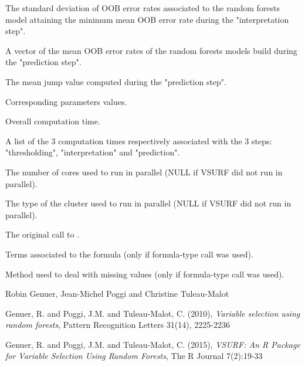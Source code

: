 \documentclass[11pt]{article}
\begin{document}
\begin{Value}
\begin{ldescription}
\item[\code{sd.min}] The standard deviation of OOB error rates associated to
the random forests model attaining the minimum mean OOB error rate during
the "interpretation step".

\item[\code{err.pred}] A vector of the mean OOB error rates of the random
forests models build during the "prediction step".

\item[\code{mean.jump}] The mean jump value computed during the "prediction
step".

\item[\code{nmin,nsd,nmj}] Corresponding parameters values.

\item[\code{overall.time}] Overall computation time.

\item[\code{comput.times}] A list of the 3 computation times respectively
associated with the 3 steps: "thresholding", "interpretation" and
"prediction".

\item[\code{ncores}] The number of cores used to run 
in parallel (NULL if VSURF did not run in parallel).

\item[\code{clusterType}] The type of the cluster used to run
 in parallel (NULL if VSURF did not run in parallel).

\item[\code{call}] The original call to .

\item[\code{terms}] Terms associated to the formula (only if formula-type call
was used).

\item[\code{na.action}] Method used to deal with missing values (only if formula-type call
was used).
\end{ldescription}
\end{Value}
%
\begin{Author}\relax
Robin Genuer, Jean-Michel Poggi and Christine Tuleau-Malot
\end{Author}
%
\begin{References}\relax
Genuer, R. and Poggi, J.M. and Tuleau-Malot, C. (2010),
\emph{Variable selection using random forests}, Pattern Recognition Letters
31(14), 2225-2236

Genuer, R. and Poggi, J.M. and Tuleau-Malot, C. (2015),
\emph{VSURF: An R Package for Variable Selection Using Random Forests},
The R Journal 7(2):19-33
\end{References}
\end{document}
